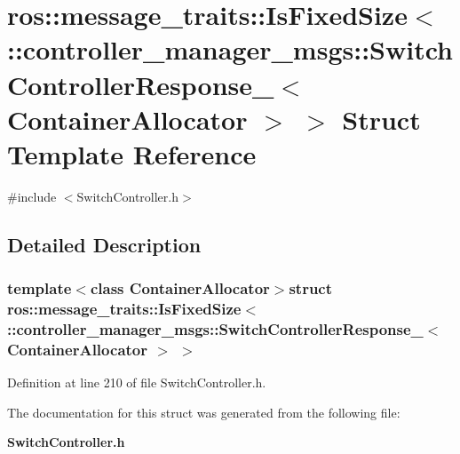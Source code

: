 \section{ros\-:\-:message\-\_\-traits\-:\-:\-Is\-Fixed\-Size$<$ \-:\-:controller\-\_\-manager\-\_\-msgs\-:\-:\-Switch\-Controller\-Response\-\_\-$<$ \-Container\-Allocator $>$ $>$ \-Struct \-Template \-Reference}
\label{structros_1_1message__traits_1_1IsFixedSize_3_01_1_1controller__manager__msgs_1_1SwitchControlle3a7c1936afb17b84662811077e2db492}


{\ttfamily \#include $<$\-Switch\-Controller.\-h$>$}



\subsection{\-Detailed \-Description}
\subsubsection*{template$<$class Container\-Allocator$>$struct ros\-::message\-\_\-traits\-::\-Is\-Fixed\-Size$<$ \-::controller\-\_\-manager\-\_\-msgs\-::\-Switch\-Controller\-Response\-\_\-$<$ Container\-Allocator $>$ $>$}



\-Definition at line 210 of file \-Switch\-Controller.\-h.



\-The documentation for this struct was generated from the following file\-:\begin{DoxyCompactItemize}
\item 
{\bf \-Switch\-Controller.\-h}\end{DoxyCompactItemize}
